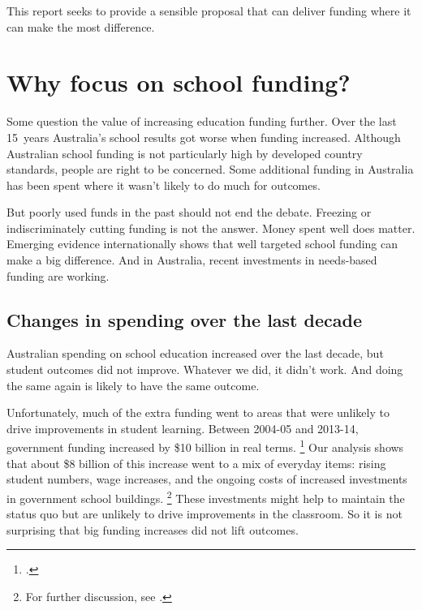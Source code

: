 \documentclass{grattan}
\begin{document}
This report seeks to provide a sensible proposal that can deliver funding where it can make the most difference.

\section{Why focus on school funding?}\label{sec:why-focus-on-school-funding}

Some question the value of increasing education funding further. Over the last 15~years Australia's school results got worse when funding increased.
Although Australian school funding is not particularly high by developed country standards, people are right to be concerned.
Some additional funding in Australia has been spent where it wasn't likely to do much for outcomes.

But poorly used funds in the past should not end the debate.
Freezing or indiscriminately cutting funding is not the answer.
Money spent well does matter.
Emerging evidence internationally shows that well targeted school funding can make a big difference.
And in Australia, recent investments in needs-based funding are working.

\subsection{Changes in spending over the last decade }\label{subsec:changes-in-spending-over-the-last-decade}
Australian spending on school education increased over the last decade, but student outcomes did not improve.
Whatever we did, it didn't work. And doing the same again is likely to have the same outcome.

Unfortunately, much of the extra funding went to areas that were unlikely to drive improvements in student learning. Between 2004-05 and 2013-14, government funding increased by \$10 billion in real terms.%
\footcite{Commission2016NationalEducationEvidence} Our analysis shows that about \$8 billion of this increase went to a mix of everyday items: rising student numbers, wage increases, and the ongoing costs of increased investments in government school buildings.%
\footnote{For further discussion, see \textcite{Goss2016SchoolFundingRose}.}
These investments might help to maintain the status quo but are unlikely to drive improvements in the classroom.
So it is not surprising that big funding increases did not lift outcomes.
\end{document}
